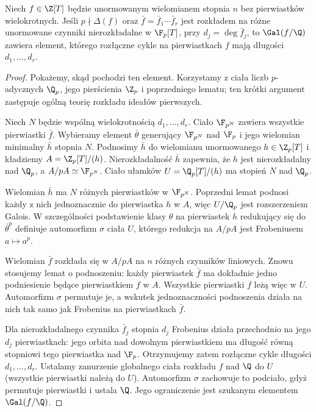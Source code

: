 \begin{twierdzenie}
Niech $f\in\Z[T]$ będzie unormowanym wielomianem stopnia $n$ bez pierwiastków wielokrotnych. Jeśli $p\nmid\Delta(f)$ oraz
$\bar f=\bar f_1\cdots\bar f_r$ jest rozkładem na różne unormowane czynniki nierozkładalne w $\F_p[T]$, przy $d_j=\deg\bar f_j$, to $\Gal(f/\Q)$ zawiera element, którego rozłączne cykle na pierwiastkach $f$ mają długości $d_1,\dots,d_r$.
\end{twierdzenie}
\begin{proof}
Pokażemy, skąd pochodzi ten element. Korzystamy z ciała liczb $p$-adycznych $\Q_p$, jego pierścienia $\Z_p$ i poprzedniego lematu; ten krótki argument zastępuje ogólną teorię rozkładu ideałów pierwszych.

Niech $N$ będzie wspólną wielokrotnością $d_1,\dots,d_r$. Ciało $\F_{p^N}$ zawiera wszystkie pierwiastki $\bar f$. Wybieramy element $\bar\theta$ generujący $\F_{p^N}$ nad $\F_p$ i jego wielomian minimalny $\bar h$ stopnia $N$. Podnosimy $\bar h$ do wielomianu unormowanego $h\in\Z_p[T]$ i kładziemy $A=\Z_p[T]/(h)$. Nierozkładalność $\bar h$ zapewnia, że $h$ jest nierozkładalny nad $\Q_p$, a $A/pA\simeq\F_{p^N}$. Ciało ułamków $U=\Q_p[T]/(h)$ ma stopień $N$ nad $\Q_p$.

Wielomian $\bar h$ ma $N$ różnych pierwiastków w $\F_{p^N}$. Poprzedni lemat podnosi każdy z nich jednoznacznie do pierwiastka $h$ w $A$, więc $U/\Q_p$ jest rozszerzeniem Galois. W szczególności podstawienie klasy $\theta$ na pierwiastek $h$ redukujący się do $\bar\theta^p$ definiuje automorfizm $\sigma$ ciała $U$, którego redukcja na $A/pA$ jest Frobeniusem $a\mapsto a^p$.

Wielomian $\bar f$ rozkłada się w $A/pA$ na $n$ różnych czynników liniowych. Znowu stosujemy lemat o podnoszeniu: każdy pierwiastek $\bar f$ ma dokładnie jedno podniesienie będące pierwiastkiem $f$ w $A$. Wszystkie pierwiastki $f$ leżą więc w $U$. Automorfizm $\sigma$ permutuje je, a wskutek jednoznaczności podnoszenia działa na nich tak samo jak Frobenius na pierwiastkach $\bar f$.

Dla nierozkładalnego czynnika $\bar f_j$ stopnia $d_j$ Frobenius działa przechodnio na jego $d_j$ pierwiastkach: jego orbita nad dowolnym pierwiastkiem ma długość równą stopniowi tego pierwiastka nad $\F_p$. Otrzymujemy zatem rozłączne cykle długości $d_1,\ldots,d_r$. Ustalamy zanurzenie globalnego ciała rozkładu $f$ nad $\Q$ do $U$ (wszystkie pierwiastki należą do $U$). Automorfizm $\sigma$ zachowuje to podciało, gdyż permutuje pierwiastki i ustala $\Q$. Jego ograniczenie jest szukanym elementem $\Gal(f/\Q)$.
\end{proof}

